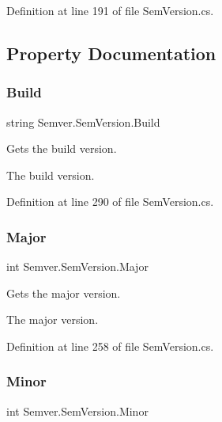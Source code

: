 Definition at line 191 of file Sem\+Version.\+cs.



\subsection{Property Documentation}
\mbox{\label{class_semver_1_1_sem_version_a665a136e947cb428968ebe21579ac0cf}} 
\subsubsection{\texorpdfstring{Build}{Build}}
{\footnotesize\ttfamily string Semver.\+Sem\+Version.\+Build\hspace{0.3cm}{\ttfamily [get]}}



Gets the build version. 

The build version. 

Definition at line 290 of file Sem\+Version.\+cs.

\mbox{\label{class_semver_1_1_sem_version_a11294c417e3952d0429cbc7e398d0d49}} 
\subsubsection{\texorpdfstring{Major}{Major}}
{\footnotesize\ttfamily int Semver.\+Sem\+Version.\+Major\hspace{0.3cm}{\ttfamily [get]}}



Gets the major version. 

The major version. 

Definition at line 258 of file Sem\+Version.\+cs.

\mbox{\label{class_semver_1_1_sem_version_a74229ba692723ce4079715c3cff26413}} 
\subsubsection{\texorpdfstring{Minor}{Minor}}
{\footnotesize\ttfamily int Semver.\+Sem\+Version.\+Minor\hspace{0.3cm}{\ttfamily [get]}}



